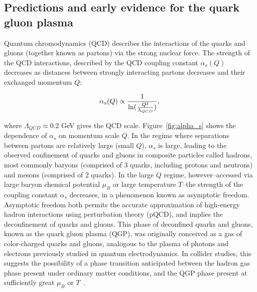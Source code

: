 
\subsection{Predictions and early evidence for the quark gluon plasma}

Quantum chromodynamics (QCD) describes the interactions of the quarks and gluons (together known as partons) via the strong nuclear force.  The strength of the QCD interactions, described by the QCD coupling constant $\alpha_{s}(Q)$ decreases as distances between strongly interacting partons decreases and their exchanged momentum $Q$: 

\begin{equation}
\label{eq:alpha_s}
\alpha_{s}(Q) \propto \frac{1}{{\rm ln}(\frac{Q^{2}}{\Lambda_{QCD}})}, 
\end{equation}

\noindent where $\Lambda_{QCD} \approx 0.2$ GeV gives the QCD scale.  Figure~\ref{fig:alpha_s} shows the dependence of $\alpha_{s}$ on momentum scale $Q$.  In the regime where separations between partons are relatively large (small $Q$), $\alpha_{s}$ is large, leading to the observed confinement of quarks and gluons in composite particles called hadrons, most commonly baryons (comprised of 3 quarks, including protons and neutrons) and mesons (comprised of 2 quarks).  In the large $Q$ regime, however--accessed via large baryon chemical potential $\mu_{B}$ or large temperature $T$--the strength of the coupling constant $\alpha_{s}$ decreases, in a phenomenon known as asymptotic freedom.  Asymptotic freedom both permits the accurate approximation of high-energy hadron interactions using perturbation theory (pQCD), and implies the deconfinement of quarks and gluons.  This phase of deconfined quarks and gluons, known as the  quark gluon plasma (QGP), was originally conceived as a gas of color-charged quarks and gluons, analogous to the plasma of photons and electrons previously studied in quantum electrodynamics.  In collider studies, this suggests the possibility of a phase transition anticipated between the hadron gas phase present under ordinary matter conditions, and the QGP phase present at sufficiently great $\mu_{B}$ or $T$~\cite{Kalashnikov:1979, Shuryak:1980tp}.

